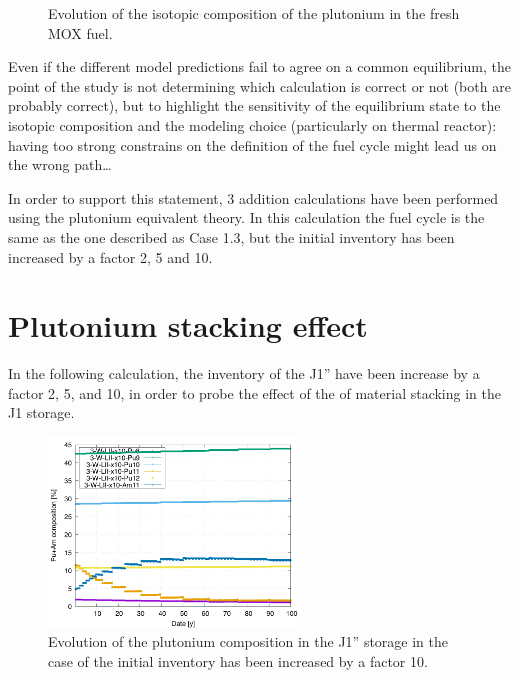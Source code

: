 \documentclass[12pt]{article}
\begin{document}
\begin{figure}[h!]
  \centering
  

  \caption{ Evolution of the isotopic composition of the plutonium in the fresh MOX fuel.
    \label{fig:pu_compo} } 
  \end{figure}

Even if the different model predictions fail to agree on a common equilibrium,
the point of the study is not determining which calculation is correct or not
(both are probably correct), but to highlight the sensitivity of the equilibrium
state to the isotopic composition and the modeling choice (particularly on
thermal reactor): having too strong constrains on the definition of the fuel
cycle might lead us on the wrong path\dots


In order to support this statement, 3 addition calculations have been performed
using the plutonium equivalent theory. In this calculation the fuel cycle is
the same as the one described as Case 1.3, but the initial inventory has been
increased by a factor 2, 5 and 10.


\section{Plutonium stacking effect}

In the following calculation, the inventory of the J1'' have been increase by a
factor 2, 5, and 10, in order to probe the effect of the of material stacking in
the J1 storage.

\begin{figure}[h!]
  \centering
  \includegraphics[width=0.6\textwidth]  {img/C_1_3_W_LII_x10_pu_composition}
  \caption{Evolution of the plutonium composition in the J1'' storage in the
  case of the initial inventory has been increased by a factor 10.}
  \label{fig:LII_compo_x10}
\end{figure}
\end{document}
